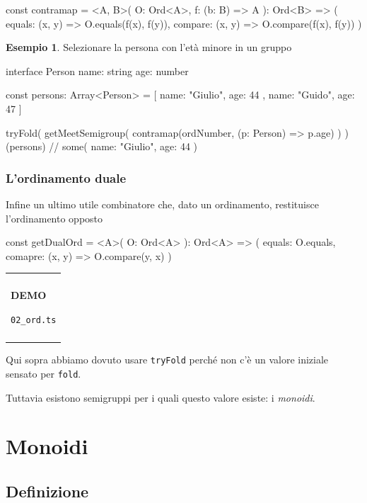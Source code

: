 \documentclass[12pt]{article}
\theoremstyle{definition}
\newtheorem{example}{Esempio}[section]
\newenvironment{demo}
    {\begin{center}
    \begin{tabular}{|p{0.9\textwidth}|}
    \hline\\
    }
    {
    \\\\\hline
    \end{tabular}
    \end{center}
    }
\newenvironment{code}
  {\vspace{0.5cm} \VerbatimEnvironment\begin{typescriptcode}}
  {\end{typescriptcode} \vspace{0.2cm}}
\begin{document}
\begin{code}
const contramap = <A, B>(
  O: Ord<A>,
  f: (b: B) => A
): Ord<B> => ({
  equals: (x, y) => O.equals(f(x), f(y)),
  compare: (x, y) => O.compare(f(x), f(y))
})
\end{code}

\begin{example}
Selezionare la persona con l'età minore in un gruppo

\begin{code}
interface Person {
  name: string
  age: number
}

const persons: Array<Person> = [
  { name: "Giulio", age: 44 },
  { name: "Guido", age: 47 }
]

tryFold(
  getMeetSemigroup(
    contramap(ordNumber, (p: Person) => p.age)
  )
)(persons) // some({ name: "Giulio", age: 44 })
\end{code}
\end{example}

\subsubsection{L'ordinamento duale}

Infine un ultimo utile combinatore che, dato un ordinamento, restituisce l'ordinamento opposto

\begin{code}
const getDualOrd = <A>(
  O: Ord<A>
): Ord<A> => ({
  equals: O.equals,
  comapre: (x, y) => O.compare(y, x)
})
\end{code}

\begin{demo}
\begin{center}
\textbf{DEMO}

\texttt{02\_ord.ts}
\end{center}
\end{demo}


Qui sopra abbiamo dovuto usare \texttt{tryFold} perché non c'è un valore iniziale sensato per \texttt{fold}.

Tuttavia esistono semigruppi per i quali questo valore esiste: i \emph{monoidi}.

\section{Monoidi}

\subsection{Definizione}
\end{document}

